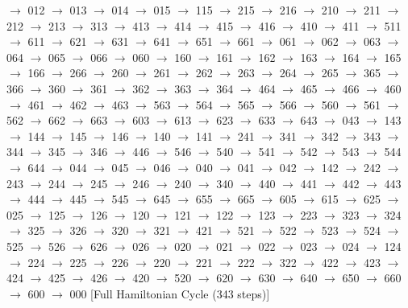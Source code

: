 $\rightarrow$ 012 $\rightarrow$ 013 $\rightarrow$ 014 $\rightarrow$ 015 $\rightarrow$ 115 $\rightarrow$ 215 $\rightarrow$ 216 $\rightarrow$ 210 $\rightarrow$ 211 $\rightarrow$ 212 $\rightarrow$ 213 $\rightarrow$ 313 $\rightarrow$ 413 $\rightarrow$ 414 $\rightarrow$ 415 $\rightarrow$ 416 $\rightarrow$ 410 $\rightarrow$ 411 $\rightarrow$ 511 $\rightarrow$ 611 $\rightarrow$ 621 $\rightarrow$ 631 $\rightarrow$ 641 $\rightarrow$ 651 $\rightarrow$ 661 $\rightarrow$ 061 $\rightarrow$ 062 $\rightarrow$ 063 $\rightarrow$ 064 $\rightarrow$ 065 $\rightarrow$ 066 $\rightarrow$ 060 $\rightarrow$ 160 $\rightarrow$ 161 $\rightarrow$ 162 $\rightarrow$ 163 $\rightarrow$ 164 $\rightarrow$ 165 $\rightarrow$ 166 $\rightarrow$ 266 $\rightarrow$ 260 $\rightarrow$ 261 $\rightarrow$ 262 $\rightarrow$ 263 $\rightarrow$ 264 $\rightarrow$ 265 $\rightarrow$ 365 $\rightarrow$ 366 $\rightarrow$ 360 $\rightarrow$ 361 $\rightarrow$ 362 $\rightarrow$ 363 $\rightarrow$ 364 $\rightarrow$ 464 $\rightarrow$ 465 $\rightarrow$ 466 $\rightarrow$ 460 $\rightarrow$ 461 $\rightarrow$ 462 $\rightarrow$ 463 $\rightarrow$ 563 $\rightarrow$ 564 $\rightarrow$ 565 $\rightarrow$ 566 $\rightarrow$ 560 $\rightarrow$ 561 $\rightarrow$ 562 $\rightarrow$ 662 $\rightarrow$ 663 $\rightarrow$ 603 $\rightarrow$ 613 $\rightarrow$ 623 $\rightarrow$ 633 $\rightarrow$ 643 $\rightarrow$ 043 $\rightarrow$ 143 $\rightarrow$ 144 $\rightarrow$ 145 $\rightarrow$ 146 $\rightarrow$ 140 $\rightarrow$ 141 $\rightarrow$ 241 $\rightarrow$ 341 $\rightarrow$ 342 $\rightarrow$ 343 $\rightarrow$ 344 $\rightarrow$ 345 $\rightarrow$ 346 $\rightarrow$ 446 $\rightarrow$ 546 $\rightarrow$ 540 $\rightarrow$ 541 $\rightarrow$ 542 $\rightarrow$ 543 $\rightarrow$ 544 $\rightarrow$ 644 $\rightarrow$ 044 $\rightarrow$ 045 $\rightarrow$ 046 $\rightarrow$ 040 $\rightarrow$ 041 $\rightarrow$ 042 $\rightarrow$ 142 $\rightarrow$ 242 $\rightarrow$ 243 $\rightarrow$ 244 $\rightarrow$ 245 $\rightarrow$ 246 $\rightarrow$ 240 $\rightarrow$ 340 $\rightarrow$ 440 $\rightarrow$ 441 $\rightarrow$ 442 $\rightarrow$ 443 $\rightarrow$ 444 $\rightarrow$ 445 $\rightarrow$ 545 $\rightarrow$ 645 $\rightarrow$ 655 $\rightarrow$ 665 $\rightarrow$ 605 $\rightarrow$ 615 $\rightarrow$ 625 $\rightarrow$ 025 $\rightarrow$ 125 $\rightarrow$ 126 $\rightarrow$ 120 $\rightarrow$ 121 $\rightarrow$ 122 $\rightarrow$ 123 $\rightarrow$ 223 $\rightarrow$ 323 $\rightarrow$ 324 $\rightarrow$ 325 $\rightarrow$ 326 $\rightarrow$ 320 $\rightarrow$ 321 $\rightarrow$ 421 $\rightarrow$ 521 $\rightarrow$ 522 $\rightarrow$ 523 $\rightarrow$ 524 $\rightarrow$ 525 $\rightarrow$ 526 $\rightarrow$ 626 $\rightarrow$ 026 $\rightarrow$ 020 $\rightarrow$ 021 $\rightarrow$ 022 $\rightarrow$ 023 $\rightarrow$ 024 $\rightarrow$ 124 $\rightarrow$ 224 $\rightarrow$ 225 $\rightarrow$ 226 $\rightarrow$ 220 $\rightarrow$ 221 $\rightarrow$ 222 $\rightarrow$ 322 $\rightarrow$ 422 $\rightarrow$ 423 $\rightarrow$ 424 $\rightarrow$ 425 $\rightarrow$ 426 $\rightarrow$ 420 $\rightarrow$ 520 $\rightarrow$ 620 $\rightarrow$ 630 $\rightarrow$ 640 $\rightarrow$ 650 $\rightarrow$ 660 $\rightarrow$ 600 $\rightarrow$ 000 [Full Hamiltonian Cycle (343 steps)]

